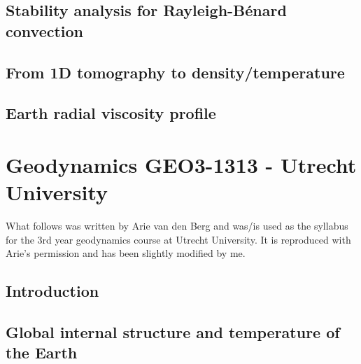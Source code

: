 \documentclass[a4paper]{article}
\begin{document}
\subsection{Stability analysis for Rayleigh-B\'enard convection} \label{ss:sarb}  %
\newpage %
\subsection{From 1D tomography to density/temperature} 
\newpage %
\subsection{Earth radial viscosity profile} 






\newpage
\section{Geodynamics GEO3-1313 - Utrecht University}
What follows was written by Arie van den Berg and was/is used as the syllabus for the 
3rd year geodynamics course at Utrecht University. It is reproduced with Arie's permission
and has been slightly modified by me.

\subsection{Introduction} %
\subsection{Global internal structure and temperature of the Earth} %
\end{document}
